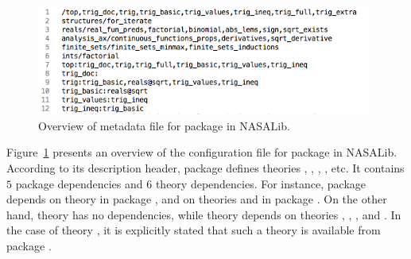 \begin{figure}
  \centering
  \includegraphics[width=11cm]{images/top.png}
  \caption{Overview of metadata file  for package
     in NASALib.}
  \label{fig.top}
\end{figure}

Figure~\ref{fig.top} presents an overview of the configuration file
for package  in NASALib. According to its description
header, package  defines theories ,
, , , etc. It contains $5$
package dependencies and $6$ theory dependencies. For instance,
package  depends on theory  in package
, and on theories  and
 in package . On the
other hand, theory  has no dependencies, while theory
 depends on theories , ,
, and . In the case of theory
, it is explicitly stated that such a theory is available
from package .

